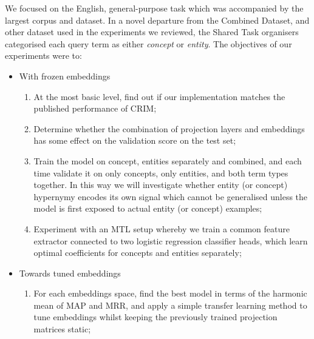 We focused on the English, general-purpose task which was accompanied by the largest corpus and dataset.  In a novel departure from the Combined Dataset, and other dataset used in the experiments we reviewed, the Shared Task organisers categorised each query term as either \textit{concept} or \textit{entity}.  The objectives of our experiments were to:
\begin{itemize}
    \item With frozen embeddings
    \begin{enumerate}
        \item At the most basic level, find out if our implementation matches the published performance of CRIM;
        \item Determine whether the combination of projection layers and embeddings has some effect on the validation score on the test set;
        \item Train the model on concept, entities separately and combined, and each time validate it on only concepts, only entities, and both term types together.  In this way we will investigate whether entity (or concept) hypernymy encodes its own signal which cannot be generalised unless the model is first exposed to actual entity (or concept) examples;
        \item Experiment with an \ac{MTL} setup whereby we train a common feature extractor connected to two logistic regression classifier heads, which learn optimal coefficients for concepts and entities separately;
    \end{enumerate}
    \item Towards tuned embeddings
    \begin{enumerate}
        \item For each embeddings space, find the best model in terms of the harmonic mean of \ac{MAP} and \ac{MRR}, and apply a simple transfer learning method to tune embeddings whilst keeping the previously trained projection matrices static;
    \end{enumerate}
\end{itemize}

